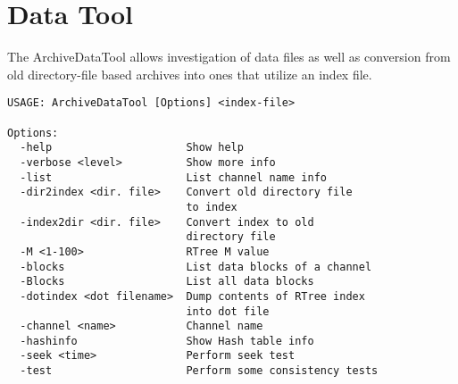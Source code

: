 \section{Data Tool}
The ArchiveDataTool allows investigation of data files as well as
conversion from old directory-file based archives into ones that
utilize an index file.

\begin{lstlisting}[frame=none,keywordstyle=\sffamily] 
USAGE: ArchiveDataTool [Options] <index-file>
 
Options:
  -help                     Show help
  -verbose <level>          Show more info
  -list                     List channel name info
  -dir2index <dir. file>    Convert old directory file
                            to index
  -index2dir <dir. file>    Convert index to old
                            directory file
  -M <1-100>                RTree M value
  -blocks                   List data blocks of a channel
  -Blocks                   List all data blocks
  -dotindex <dot filename>  Dump contents of RTree index
                            into dot file
  -channel <name>           Channel name
  -hashinfo                 Show Hash table info
  -seek <time>              Perform seek test
  -test                     Perform some consistency tests
\end{lstlisting}
